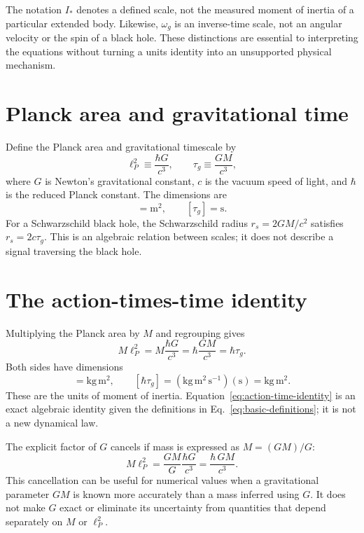 \documentclass[12pt]{article}
\begin{document}
The notation $I_*$ denotes a defined scale, not the measured moment of inertia of a particular extended body. Likewise, $\omega_g$ is an inverse-time scale, not an angular velocity or the spin of a black hole. These distinctions are essential to interpreting the equations without turning a units identity into an unsupported physical mechanism.

\section{Planck area and gravitational time}

Define the Planck area and gravitational timescale by
\begin{equation}
  \ell_P^2\equiv\frac{\hbar G}{c^3},
  \qquad
  \tau_g\equiv\frac{GM}{c^3},
  \label{eq:basic-definitions}
\end{equation}
where $G$ is Newton's gravitational constant, $c$ is the vacuum speed of light, and $\hbar$ is the reduced Planck constant. The dimensions are
\begin{equation}
  [\ell_P^2]=\mathrm{m^2},
  \qquad
  [\tau_g]=\mathrm{s}.
  \label{eq:basic-units}
\end{equation}
For a Schwarzschild black hole, the Schwarzschild radius $r_s=2GM/c^2$ satisfies $r_s=2c\tau_g$. This is an algebraic relation between scales; it does not describe a signal traversing the black hole.

\section{The action-times-time identity}

Multiplying the Planck area by $M$ and regrouping gives
\begin{equation}
  M\ell_P^2
  =M\frac{\hbar G}{c^3}
  =\hbar\frac{GM}{c^3}
  =\hbar\tau_g.
  \label{eq:action-time-identity}
\end{equation}
Both sides have dimensions
\begin{equation}
  [M\ell_P^2]
  =\mathrm{kg\,m^2},
  \qquad
  [\hbar\tau_g]
  =(\mathrm{kg\,m^2\,s^{-1}})(\mathrm{s})
  =\mathrm{kg\,m^2}.
  \label{eq:inertia-units}
\end{equation}
These are the units of moment of inertia. Equation~\eqref{eq:action-time-identity} is an exact algebraic identity given the definitions in Eq.~\eqref{eq:basic-definitions}; it is not a new dynamical law.

The explicit factor of $G$ cancels if mass is expressed as $M=(GM)/G$:
\begin{equation}
  M\ell_P^2
  =\frac{GM}{G}\frac{\hbar G}{c^3}
  =\frac{\hbar\,GM}{c^3}.
  \label{eq:g-cancellation}
\end{equation}
This cancellation can be useful for numerical values when a gravitational parameter $GM$ is known more accurately than a mass inferred using $G$. It does not make $G$ exact or eliminate its uncertainty from quantities that depend separately on $M$ or $\ell_P^2$.
\end{document}
